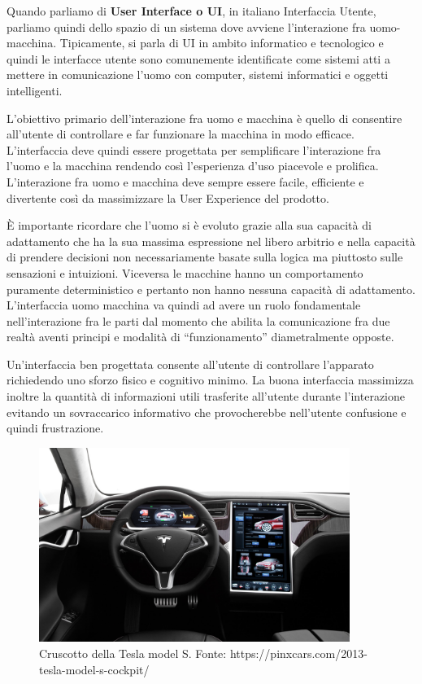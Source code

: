 Quando parliamo di \textbf{User Interface o UI}, in italiano Interfaccia Utente, parliamo quindi dello spazio di un sistema dove avviene l'interazione fra uomo-macchina. Tipicamente, si parla di UI in ambito informatico e tecnologico e quindi le interfacce utente sono comunemente identificate come sistemi atti a mettere in comunicazione l'uomo con computer, sistemi informatici e oggetti intelligenti.

L'obiettivo primario dell'interazione fra uomo e macchina è quello di consentire all'utente di controllare e far funzionare la macchina in modo efficace. L'interfaccia deve quindi essere progettata per semplificare l'interazione fra l'uomo e la macchina rendendo così l'esperienza d'uso piacevole e prolifica. L'interazione fra uomo e macchina deve sempre essere facile, efficiente e divertente così da massimizzare la User Experience del prodotto.

È importante ricordare che l'uomo si è evoluto grazie alla sua capacità di adattamento che ha la sua massima espressione nel libero arbitrio e nella capacità di prendere decisioni non necessariamente basate sulla logica ma piuttosto sulle sensazioni e intuizioni. Viceversa le macchine hanno un comportamento puramente deterministico e pertanto non hanno nessuna capacità di adattamento. L'interfaccia uomo macchina va quindi ad avere un ruolo fondamentale nell'interazione fra le parti dal momento che abilita la comunicazione fra due realtà aventi principi e modalità di ``funzionamento'' diametralmente opposte.

Un'interfaccia ben progettata consente all'utente di controllare l'apparato richiedendo uno sforzo fisico e cognitivo minimo. La buona interfaccia massimizza inoltre la quantità di informazioni utili trasferite all'utente durante l'interazione evitando un sovraccarico informativo che provocherebbe nell'utente confusione e quindi frustrazione.

\begin{figure}[!h]
	\centering
	\includegraphics[width=0.9\textwidth]{immagini/tesla.jpg}
	\caption{Cruscotto della Tesla model S. Fonte: 
https://pinxcars.com/2013-tesla-model-s-cockpit/}
\end{figure}

